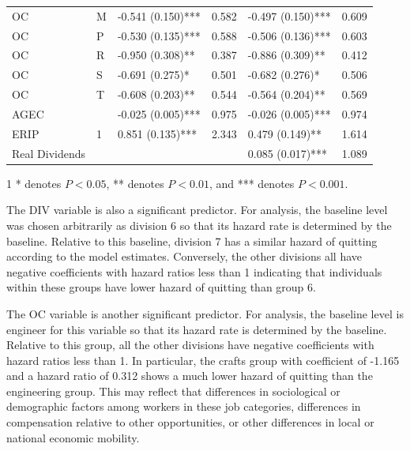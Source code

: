 \begin{table}[htbp]
\begin{threeparttable}
\begin{tabular}{llL{2.5cm}L{1.5cm}L{2.5cm}L{1.5cm}}
			OC  & M     & -0.541 (0.150)*** & 0.582 & -0.497 (0.150)*** & 0.609 \\
			OC  & P     & -0.530 (0.135)*** & 0.588 & -0.506 (0.136)*** & 0.603 \\
			OC  & R     & -0.950 (0.308)** & 0.387 & -0.886 (0.309)** & 0.412 \\
			OC  & S     & -0.691 (0.275)* & 0.501 & -0.682 (0.276)* & 0.506 \\
			OC  & T     & -0.608 (0.203)** & 0.544 & -0.564 (0.204)** & 0.569 \\
			AGEC &       & -0.025 (0.005)*** & 0.975 & -0.026 (0.005)*** & 0.974 \\
			ERIP  & 1     & 0.851 (0.135)*** & 2.343 & 0.479 (0.149)** & 1.614 \\
			Real Dividends &       &       &       & 0.085 (0.017)*** & 1.089 \\
			\bottomrule
		\end{tabular}%
		\begin{tablenotes}
			\item[1] * denotes $P<0.05$, ** denotes $P<0.01$, and *** denotes $P<0.001$.
		\end{tablenotes}
		
	\end{threeparttable}
	\label{tab:vqparaest}%
\end{table}

The DIV variable is also a significant predictor.  For analysis, the baseline level was chosen arbitrarily as division 6 so that its hazard rate is determined by the baseline. Relative to this baseline, division 7 has a similar hazard of quitting according to the model estimates. Conversely, the other divisions all have negative coefficients with hazard ratios less than 1 indicating that individuals within these groups have lower hazard of quitting than group 6.

The OC variable is another significant predictor. For analysis, the baseline level is engineer for this variable so that its hazard rate is determined by the baseline. Relative to this group, all the other divisions have negative coefficients with hazard ratios less than 1. In particular, the crafts group with coefficient of -1.165 and a hazard ratio of 0.312 shows a much lower hazard of quitting than the engineering group. This may reflect that differences in sociological or demographic factors among workers in these job categories, differences in compensation relative to other opportunities, or other differences in local or national economic mobility.	 

